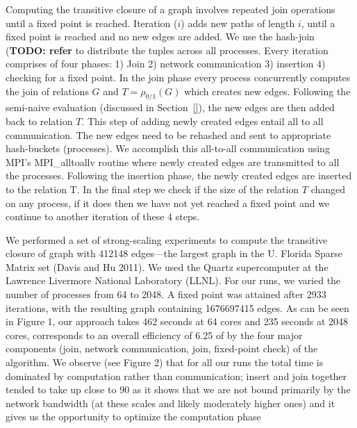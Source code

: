 Computing the transitive closure of a graph involves repeated join operations until a fixed point is reached. 
Iteration ($i$) adds new paths of length $i$, until a fixed point is reached and no new edges are added.
We use the hash-join (\textbf{TODO: refer} to distribute the tuples across all processes.
Every iteration comprises of four phases: 1) Join 2) network communication 3) insertion 4) checking for a
fixed point. In the join phase every process concurrently computes the join of relations $G$ and $T = \rho_{0 / 1}(G)$ which creates new edges. Following the semi-naive evaluation (discussed in Section~\ref{}), the new edges are then added back to relation $T$. This step of adding newly created edges entail all to all communication. The new edges need to be rehashed and sent to appropriate hash-buckets (processes). 
We accomplish this all-to-all communication using MPI’s MPI\_alltoallv routine where newly created edges are transmitted to all the processes.
Following the insertion phase, the newly created edges are inserted to the relation T.
In the final step we check if the size of the relation $T$ changed on any process, if it does then we have not yet reached a fixed point and we continue to
another iteration of these 4 steps.


We performed a set of strong-scaling experiments to compute the transitive closure of graph with 412148
edges—the largest graph in the U. Florida Sparse Matrix set (Davis and Hu 2011). We used the Quartz supercomputer
at the Lawrence Livermore National Laboratory (LLNL). For our runs, we varied the number of processes
from 64 to 2048. A fixed point was attained after 2933 iterations, with the resulting graph containing 1676697415
edges. As can be seen in Figure 1, our approach takes 462 seconds at 64 cores and 235 seconds at 2048 cores, corresponds
to an overall efficiency of 6.25%
of by the four major components (join, network communication, join, fixed-point check) of the algorithm. We
observe (see Figure 2) that for all our runs the total time is dominated by computation rather than communication;
insert and join together tended to take up close to 90%
as it shows that we are not bound primarily by the network bandwidth (at these scales and likely moderately
higher ones) and it gives us the opportunity to optimize the computation phase

